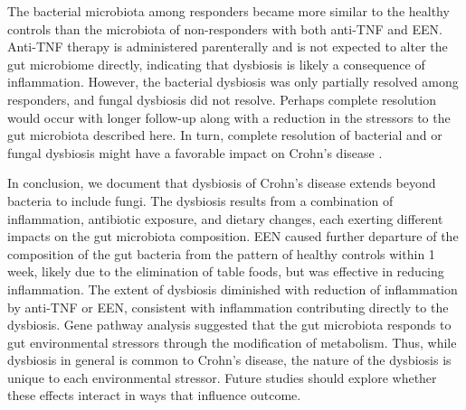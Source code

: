 The bacterial microbiota among responders became more similar to the healthy controls than the microbiota of non-responders with both anti-TNF and EEN. Anti-TNF therapy is administered parenterally and is not expected to alter the gut microbiome directly, indicating that dysbiosis is likely a consequence of inflammation. However, the bacterial dysbiosis was only partially resolved among responders, and fungal dysbiosis did not resolve. Perhaps complete resolution would occur with longer follow-up along with a reduction in the stressors to the gut microbiota described here. In turn, complete resolution of bacterial and or fungal dysbiosis might have a favorable impact on Crohn's disease \citep{Rajca:2014bi, Samuel:2010en}.

In conclusion, we document that dysbiosis of Crohn's disease extends beyond bacteria to include fungi. The dysbiosis results from a combination of inflammation, antibiotic exposure, and dietary changes, each exerting different impacts on the gut microbiota composition. EEN caused further departure of the composition of the gut bacteria from the pattern of healthy controls within 1 week, likely due to the elimination of table foods, but was effective in reducing inflammation. The extent of dysbiosis diminished with reduction of inflammation by anti-TNF or EEN, consistent with inflammation contributing directly to the dysbiosis. Gene pathway analysis suggested that the gut microbiota responds to gut environmental stressors through the modification of metabolism. Thus, while dysbiosis in general is common to Crohn's disease, the nature of the dysbiosis is unique to each environmental stressor. Future studies should explore whether these effects interact in ways that influence outcome.







